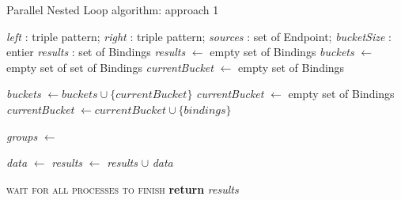 \begin{algorithm}[t]
    \caption{Parallel Nested Loop algorithm: approach 1}\label{algo:pbj}
    \begin{algorithmic}[1]
        \Require \textit{left} : triple pattern; \textit{right} : triple pattern; \textit{sources} : set of Endpoint; \textit{bucketSize} : entier
        \Ensure \textit{results} : set of Bindings
            \State \textit{results} $\gets$ empty set of Bindings
            \State \textit{buckets} $\gets$ empty set of set of Bindings
            \State \textit{currentBucket} $\gets$ empty set of Bindings
            
                    \State \textit{buckets} $\gets \textit{buckets} \cup \{ \textit{currentBucket} \}$
                    \State \textit{currentBucket} $\gets$ empty set of Bindings
                \EndIf
                \State \textit{currentBucket} $\gets \textit{currentBucket} \cup \{ \textit{bindings} \}$
            \EndFor
            
            \State \textit{groups} $\gets$ 
            
                \State \textit{data} $\gets$ 
                \State \textit{results} $\gets$ \textit{results} $\cup$ \textit{data}
            \EndFor
            
            \State \textsc{wait for all processes to finish}
            \State \textbf{return} \textit{results}
        \EndFunction
    \end{algorithmic}
\end{algorithm}
